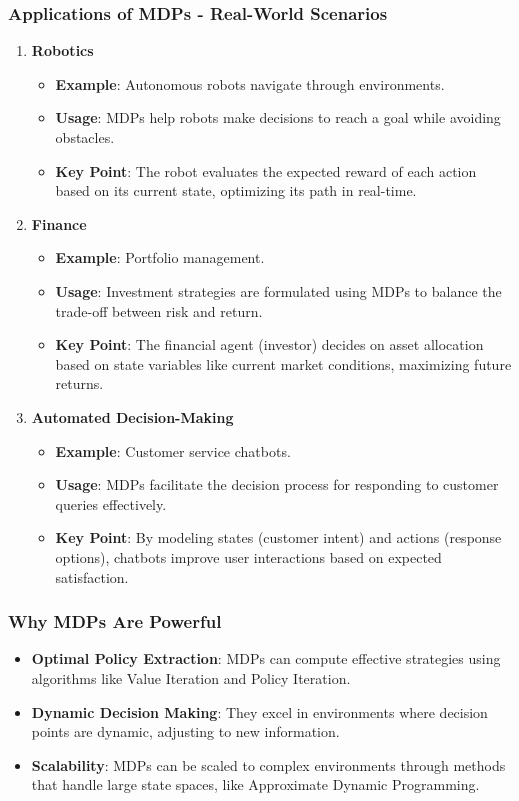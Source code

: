 \documentclass[aspectratio=169]{beamer}
\begin{document}
\begin{frame}[fragile]
  \frametitle{Applications of MDPs - Real-World Scenarios}
  \begin{enumerate}
    \item \textbf{Robotics}
      \begin{itemize}
        \item \textbf{Example}: Autonomous robots navigate through environments.
        \item \textbf{Usage}: MDPs help robots make decisions to reach a goal while avoiding obstacles.
        \item \textbf{Key Point}: The robot evaluates the expected reward of each action based on its current state, optimizing its path in real-time.
      \end{itemize}

    \item \textbf{Finance}
      \begin{itemize}
        \item \textbf{Example}: Portfolio management.
        \item \textbf{Usage}: Investment strategies are formulated using MDPs to balance the trade-off between risk and return.
        \item \textbf{Key Point}: The financial agent (investor) decides on asset allocation based on state variables like current market conditions, maximizing future returns.
      \end{itemize}

    \item \textbf{Automated Decision-Making}
      \begin{itemize}
        \item \textbf{Example}: Customer service chatbots.
        \item \textbf{Usage}: MDPs facilitate the decision process for responding to customer queries effectively.
        \item \textbf{Key Point}: By modeling states (customer intent) and actions (response options), chatbots improve user interactions based on expected satisfaction.
      \end{itemize}
  \end{enumerate}
\end{frame}

\begin{frame}[fragile]
  \frametitle{Why MDPs Are Powerful}
  \begin{itemize}
    \item \textbf{Optimal Policy Extraction}: MDPs can compute effective strategies using algorithms like Value Iteration and Policy Iteration.
    \item \textbf{Dynamic Decision Making}: They excel in environments where decision points are dynamic, adjusting to new information.
    \item \textbf{Scalability}: MDPs can be scaled to complex environments through methods that handle large state spaces, like Approximate Dynamic Programming.
  \end{itemize}
\end{frame}
\end{document}
